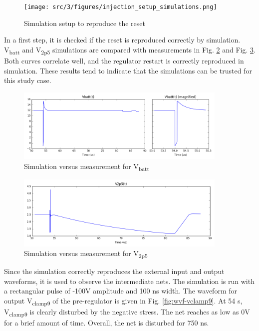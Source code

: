 \begin{figure}[!htbp]
  \centering
  \texttt{[image: src/3/figures/injection\_setup\_simulations.png]}
  \caption{Simulation setup to reproduce the reset}
  \label{fig:sim-setup-reset}
\end{figure}

In a first step, it is checked if the reset is reproduced correctly by simulation.
V\textsubscript{batt} and V\textsubscript{2p5} simulations are compared with measurements in Fig. \ref{fig:wvf-vbatt} and Fig. \ref{fig:wvf-v2p5}.
Both curves correlate well, and the regulator restart is correctly reproduced in simulation.
These results tend to indicate that the simulations can be trusted for this study case.

\begin{figure}[!htbp]
  \centering
  \includegraphics[width=0.9\textwidth]{src/3/figures/vbatt.png}
  \caption{Simulation versus measurement for V\textsubscript{batt}}
  \label{fig:wvf-vbatt}
\end{figure}

\begin{figure}[!htbp]
  \centering
  \includegraphics[width=0.9\textwidth]{src/3/figures/v2p5.png}
  \caption{Simulation versus measurement for V\textsubscript{2p5}}
  \label{fig:wvf-v2p5}
\end{figure}

Since the simulation correctly reproduces the external input and output waveforms, it is used to observe the intermediate nets.
The simulation is run with a rectangular pulse of -100V amplitude and 100 ns width.
The waveform for output V\textsubscript{clamp9} of the pre-regulator is given in Fig. \ref{fig:wvf-vclamp9}.
At 54 \textmugreek{}s,  V\textsubscript{clamp9} is clearly disturbed by the negative stress.
The net reaches as low as 0V for a brief amount of time.
Overall, the net is disturbed for 750 ns.

